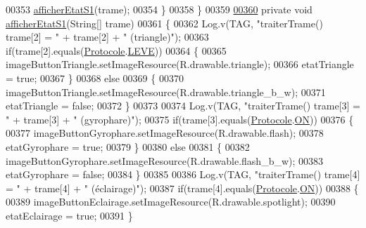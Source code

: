 \begin{DoxyCode}
00353             \hyperlink{classcom_1_1lasalle_1_1io__trucks_1_1_main_activity_ac820f476b430c74a1201d9a906fd8429}{afficherEtatS1}(trame);
00354         \}
00358     \}
00359 
\hyperlink{classcom_1_1lasalle_1_1io__trucks_1_1_main_activity_ac820f476b430c74a1201d9a906fd8429}{00360}     \textcolor{keyword}{private} \textcolor{keywordtype}{void} \hyperlink{classcom_1_1lasalle_1_1io__trucks_1_1_main_activity_ac820f476b430c74a1201d9a906fd8429}{afficherEtatS1}(String[] trame)
00361     \{
00362         Log.v(TAG, \textcolor{stringliteral}{"traiterTrame() trame[2] = "} + trame[2] + \textcolor{stringliteral}{" (triangle)"});
00363         \textcolor{keywordflow}{if}(trame[2].equals(\hyperlink{classcom_1_1lasalle_1_1io__trucks_1_1_protocole}{Protocole}.\hyperlink{classcom_1_1lasalle_1_1io__trucks_1_1_protocole_aca580f756cf43aa0010a016f56ff5c5d}{LEVE}))
00364         \{
00365             imageButtonTriangle.setImageResource(R.drawable.triangle);
00366             etatTriangle = \textcolor{keyword}{true};
00367         \}
00368         \textcolor{keywordflow}{else}
00369         \{
00370             imageButtonTriangle.setImageResource(R.drawable.triangle\_b\_w);
00371             etatTriangle = \textcolor{keyword}{false};
00372         \}
00373 
00374         Log.v(TAG, \textcolor{stringliteral}{"traiterTrame() trame[3] = "} + trame[3] + \textcolor{stringliteral}{" (gyrophare)"});
00375         \textcolor{keywordflow}{if}(trame[3].equals(\hyperlink{classcom_1_1lasalle_1_1io__trucks_1_1_protocole}{Protocole}.\hyperlink{classcom_1_1lasalle_1_1io__trucks_1_1_protocole_abe095f5652f01c6e6ebdbca02096067a}{ON}))
00376         \{
00377             imageButtonGyrophare.setImageResource(R.drawable.flash);
00378             etatGyrophare = \textcolor{keyword}{true};
00379         \}
00380         \textcolor{keywordflow}{else}
00381         \{
00382             imageButtonGyrophare.setImageResource(R.drawable.flash\_b\_w);
00383             etatGyrophare = \textcolor{keyword}{false};
00384         \}
00385 
00386         Log.v(TAG, \textcolor{stringliteral}{"traiterTrame() trame[4] = "} + trame[4] + \textcolor{stringliteral}{" (éclairage)"});
00387         \textcolor{keywordflow}{if}(trame[4].equals(\hyperlink{classcom_1_1lasalle_1_1io__trucks_1_1_protocole}{Protocole}.\hyperlink{classcom_1_1lasalle_1_1io__trucks_1_1_protocole_abe095f5652f01c6e6ebdbca02096067a}{ON}))
00388         \{
00389             imageButtonEclairage.setImageResource(R.drawable.spotlight);
00390             etatEclairage = \textcolor{keyword}{true};
00391         \}

\end{DoxyCode}
